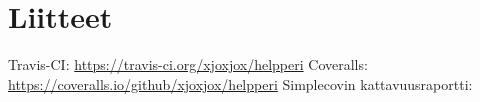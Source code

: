\documentclass[a4paper,12pt, titlepage]{article}
\begin{document}
\section{Liitteet}

Travis-CI:
\url{https://travis-ci.org/xjoxjox/helpperi}
\newline
Coveralls:
\url{https://coveralls.io/github/xjoxjox/helpperi}
\newline
\newline
Simplecovin kattavuusraportti:
\newline
\newline
\noindent{}
      
\end{document}
